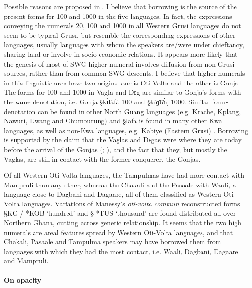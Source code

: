 Possible reasons are proposed in
\cite{vonM10}. I believe that borrowing is the source of the present forms for
100 and 1000 in the five languages.  In fact, the expressions conveying the
numerals 20, 100 and 1000 in all Western
Grusi languages do not seem to be typical Grusi, but resemble  the
corresponding expressions of other  languages, usually
languages with whom the speakers are/were under chieftancy, sharing land or
 involve in socio-economic
relations.   It appears more likely that the genesis of most of SWG higher
numeral involves diffusion from non-Grusi sources, rather than from  common SWG
descents. I believe that higher numerals in this linguistic area have two
origins: one is Oti-Volta and the other is Gonja. 
The  forms for 100 and 1000  in Vagla and Dɛg  are similar
to Gonja's forms with the same
denotation, i.e. Gonja {\S  kɪ̀làfá} 100 and  {\S  kíɡ͡bɪ́ŋ} 1000.  Similar
form-denotation can be found in other North Guang languages (e.g.
Krache, Kplang, Nawuri, Dwang and Chumburung) and {\S lafa} is found in many
other Kwa languages, as well as  non-Kwa languages, e.g. Kabiye (Eastern
Grusi)  \citep{Chan09}. Borrowing is  supported by the claim that the Vaglas
and Dɛgas were where they are today before the arrival of the Gonjas
 (\citet[12-13]{Good54}; \citet[516]{Ratt32a}), and the fact that they, but
mostly the Vaglas, are still in contact with the former conquerer, the Gonjas. 

Of all Western  Oti-Volta languages, the Tampulmas have had more contact with
Mampruli  than any other, whereas the Chakali and the Pasaale
with Waali, a language close to  Dagbani and Dagaare, all of them classified as
Western  Oti-Volta languages. Variations of Manessy's {\it oti-volta commun}
reconstructed forms {\S *KO / *KOB}  `hundred'  and {\S
*TUS}  `thousand'  are found
distributed all over Northern
Ghana, cutting across genetic relationship.  It seems that the two high
numerals are areal features spread by Western  Oti-Volta languages,   and that
Chakali, Pasaale and Tampulma speakers may  have borrowed them from languages 
with which they had the most contact, i.e.   Waali, Dagbani, Dagaare and 
Mampruli.





\paragraph{On opacity}
\label{sec:NUM-opacity}



